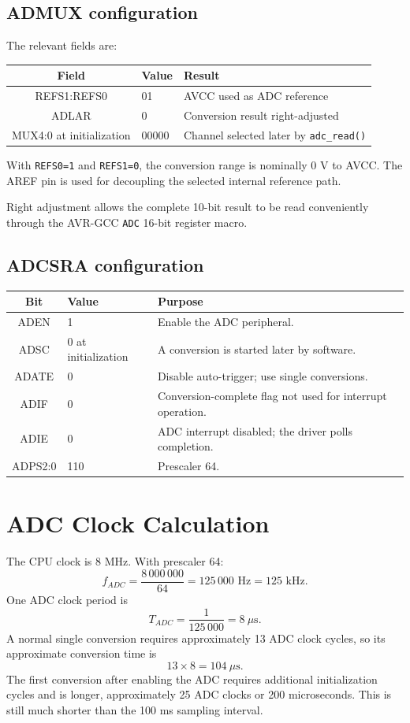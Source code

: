 \documentclass[11pt,a4paper]{article}
\begin{document}
\subsection{ADMUX configuration}
The relevant fields are:
\begin{center}
\begin{tabular}{cll}
\toprule
Field & Value & Result \\
\midrule
REFS1:REFS0 & 01 & AVCC used as ADC reference \\
ADLAR & 0 & Conversion result right-adjusted \\
MUX4:0 at initialization & 00000 & Channel selected later by \texttt{adc\_read()} \\
\bottomrule
\end{tabular}
\end{center}
With \texttt{REFS0=1} and \texttt{REFS1=0}, the conversion range is nominally 0 V to AVCC. The AREF pin is used for decoupling the selected internal reference path.

Right adjustment allows the complete 10-bit result to be read conveniently through the AVR-GCC \texttt{ADC} 16-bit register macro.

\subsection{ADCSRA configuration}
\begin{center}
\begin{tabular}{clp{}}
\toprule
Bit & Value & Purpose \\
\midrule
ADEN & 1 & Enable the ADC peripheral. \\
ADSC & 0 at initialization & A conversion is started later by software. \\
ADATE & 0 & Disable auto-trigger; use single conversions. \\
ADIF & 0 & Conversion-complete flag not used for interrupt operation. \\
ADIE & 0 & ADC interrupt disabled; the driver polls completion. \\
ADPS2:0 & 110 & Prescaler 64. \\
\bottomrule
\end{tabular}
\end{center}

\section{ADC Clock Calculation}
The CPU clock is 8 MHz. With prescaler 64:
\[
f_{ADC}=\frac{8\,000\,000}{64}=125\,000\text{ Hz}=125\text{ kHz}.
\]
One ADC clock period is
\[
T_{ADC}=\frac{1}{125\,000}=8\ \mu\text{s}.
\]
A normal single conversion requires approximately 13 ADC clock cycles, so its approximate conversion time is
\[
13\times8=104\ \mu\text{s}.
\]
The first conversion after enabling the ADC requires additional initialization cycles and is longer, approximately 25 ADC clocks or 200 microseconds. This is still much shorter than the 100 ms sampling interval.
\end{document}
